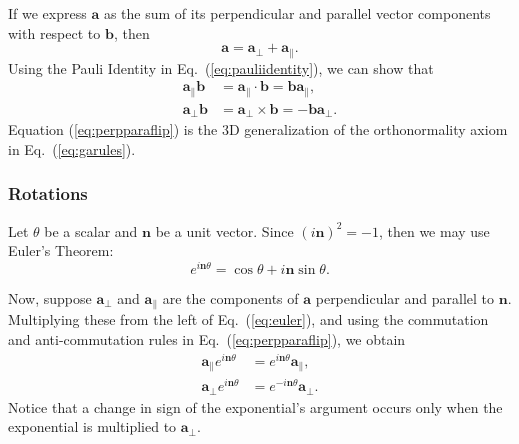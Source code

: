 \documentclass[a4paper,twocolumn,superscriptaddress]{revtex4-1}
\begin{document}
If we express $\mathbf{a}$ as the sum of its perpendicular and parallel vector components with respect to $\mathbf{b}$, then
\begin{equation} 
  \label{eq:aperpparasum}
  \mathbf a = \mathbf{a}_\perp +\mathbf{a}_\parallel .
\end{equation}
Using the Pauli Identity in Eq.~(\ref{eq:pauliidentity}), we can show that
\begin{subequations}
  \label{eq:perpparaflip}
  \begin{align} 
    \label{eq:paraflip}
    \mathbf{a}_\parallel \mathbf{b} &= 
    \mathbf{a}_\parallel \cdot \mathbf{b} = 
    \mathbf{b} \mathbf{a}_\parallel ,
    \\
    \label{eq:perpflip} 
    \mathbf{a}_\perp \mathbf{b} &= 
    \mathbf{a}_\perp \times \mathbf{b} = - \mathbf{b} \mathbf{a}_\perp .
  \end{align}
\end{subequations}
Equation (\ref{eq:perpparaflip}) is the 3D generalization of the 
orthonormality axiom in Eq.~(\ref{eq:garules}).

\subsubsection{Rotations}

Let $\theta$ be a scalar and $\mathbf n$ be a unit vector. Since 
$ (i \mathbf n)^2 = -1 $,
then we may use Euler's Theorem:
\begin{equation} 
  \label{eq:euler}
  e^{i \mathbf{n} \theta} = 
  \cos \theta + i \mathbf n \sin \theta .
\end{equation}

Now, suppose $\mathbf a_\perp$ and  $\mathbf a_\parallel$ are the components of 
$\mathbf a$ perpendicular and parallel to $\mathbf n$. Multiplying these 
from the left of Eq.~(\ref{eq:euler}), and using the commutation and 
anti-commutation rules in Eq.~(\ref{eq:perpparaflip}), we obtain
\begin{subequations} 
  \label{eq:expperparaflip}
  \begin{align} 
    \label{eq:expparaflip} 
    \mathbf{a}_\parallel e^{i \mathbf{n} \theta} &= 
    e^{i \mathbf{n} \theta} \mathbf{a}_\parallel ,
    \\
    \label{eq:expperpflip} 
    \mathbf{a}_\perp e^{i \mathbf{n} \theta} &= 
    e^{-i \mathbf{n} \theta} \mathbf{a}_\perp .
  \end{align}
\end{subequations}
Notice that a change in sign of the exponential's argument occurs only 
when the exponential is multiplied to $\mathbf a_\perp$.
\end{document}

